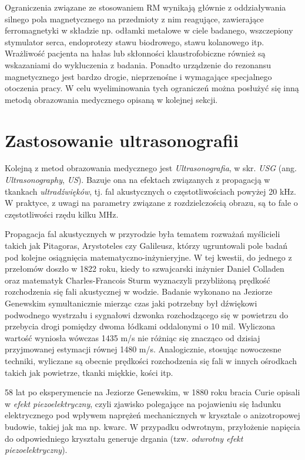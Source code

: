 Ograniczenia związane ze stosowaniem RM wynikają głównie z oddziaływania silnego pola magnetycznego na przedmioty z nim reagujące, zawierające ferromagnetyki w składzie np. odłamki metalowe w ciele badanego, wszczepiony stymulator serca, endoprotezy stawu biodrowego, stawu kolanowego itp. Wrażliwość pacjenta na hałas lub skłonności klaustrofobiczne również są wskazaniami do wykluczenia z badania. Ponadto urządzenie do rezonansu magnetycznego jest bardzo drogie, nieprzenośne i wymagające specjalnego otoczenia pracy. W celu wyeliminowania tych ograniczeń można posłużyć się inną metodą obrazowania medycznego opisaną w kolejnej sekcji. 

\section{Zastosowanie ultrasonografii}
\label{USG}

Kolejną z metod obrazowania medycznego jest \textit{Ultrasonografia}, w skr. \textit{USG} (ang. \textit{Ultrasonography}, \textit{US}). Bazuje ona na efektach związanych z propagacją w tkankach \textit{ultradźwięków}, tj. fal akustycznych o częstotliwościach powyżej 20 kHz. W praktyce, z uwagi na parametry związane z rozdzielczością obrazu, są to fale o częstotliwości rzędu kilku MHz.

Propagacja fal akustycznych w przyrodzie była tematem rozważań myślicieli takich jak Pitagoras, Arystoteles czy Galileusz, którzy ugruntowali pole badań pod kolejne osiągnięcia matematyczno-inżynieryjne. W tej kwestii, do jednego z przełomów doszło w 1822 roku, kiedy to szwajcarski inżynier Daniel Colladen oraz matematyk Charles-Francois Sturm wyznaczyli przybliżoną prędkość rozchodzenia się fali akustycznej w wodzie. Badanie wykonano na Jeziorze Genewskim symultanicznie mierząc czas jaki potrzebny był dźwiękowi podwodnego wystrzału i sygnałowi dzwonka rozchodzącego się w powietrzu do przebycia drogi pomiędzy dwoma łódkami oddalonymi o 10 mil. Wyliczona wartość wyniosła wówczas 1435 m/s nie różniąc się znacząco od dzisiaj przyjmowanej estymacji równej 1480 m/s. Analogicznie, stosując nowoczesne techniki, wyliczane są obecnie prędkości rozchodzenia się fali w innych ośrodkach takich jak powietrze, tkanki miękkie, kości itp.

58 lat po eksperymencie na Jeziorze Genewskim, w 1880 roku bracia Curie opisali w \cite{Curie1880} \textit{efekt piezoelektryczny}, czyli zjawisko polegające na pojawieniu się ładunku elektrycznego pod wpływem naprężeń mechanicznych w krysztale o anizotropowej budowie, takiej jak ma np. kwarc. W przypadku odwrotnym, przyłożenie napięcia do odpowiedniego kryształu generuje drgania (tzw. \textit{odwrotny efekt piezoelektryczny}). 

